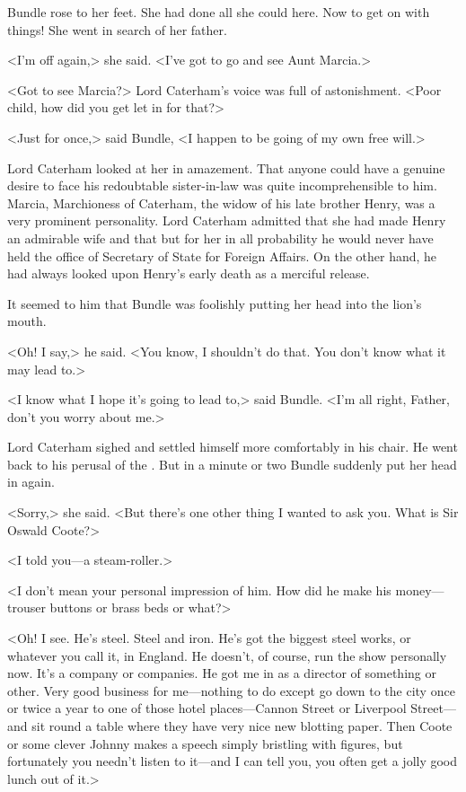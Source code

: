 Bundle rose to her feet. She had done all she could here. Now to get on with things! She went in search of her father.

<I'm off again,> she said. <I've got to go and see Aunt Marcia.>

<Got to see Marcia?> Lord Caterham's voice was full of astonishment. <Poor child, how did you get let in for that?>

<Just for once,> said Bundle, <I happen to be going of my own free will.>

Lord Caterham looked at her in amazement. That anyone could have a genuine desire to face his redoubtable sister-in-law was quite incomprehensible to him. Marcia, Marchioness of Caterham, the widow of his late brother Henry, was a very prominent personality. Lord Caterham admitted that she had made Henry an admirable wife and that but for her in all probability he would never have held the office of Secretary of State for Foreign Affairs. On the other hand, he had always looked upon Henry's early death as a merciful release.

It seemed to him that Bundle was foolishly putting her head into the lion's mouth.

<Oh! I say,> he said. <You know, I shouldn't do that. You don't know what it may lead to.>

<I know what I hope it's going to lead to,> said Bundle. <I'm all right, Father, don't you worry about me.>

Lord Caterham sighed and settled himself more comfortably in his chair. He went back to his perusal of the . But in a minute or two Bundle suddenly put her head in again.

<Sorry,> she said. <But there's one other thing I wanted to ask you. What is Sir Oswald Coote?>

<I told you—a steam-roller.>

<I don't mean your personal impression of him. How did he make his money—trouser buttons or brass beds or what?>

<Oh! I see. He's steel. Steel and iron. He's got the biggest steel works, or whatever you call it, in England. He doesn't, of course, run the show personally now. It's a company or companies. He got me in as a director of something or other. Very good business for me—nothing to do except go down to the city once or twice a year to one of those hotel places—Cannon Street or Liverpool Street—and sit round a table where they have very nice new blotting paper. Then Coote or some clever Johnny makes a speech simply bristling with figures, but fortunately you needn't listen to it—and I can tell you, you often get a jolly good lunch out of it.>

